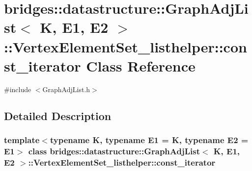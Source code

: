 \hypertarget{classbridges_1_1datastructure_1_1_graph_adj_list_1_1_vertex_element_set__listhelper_1_1const__iterator}{}\section{bridges\+:\+:datastructure\+:\+:Graph\+Adj\+List$<$ K, E1, E2 $>$\+:\+:Vertex\+Element\+Set\+\_\+listhelper\+:\+:const\+\_\+iterator Class Reference}
\label{classbridges_1_1datastructure_1_1_graph_adj_list_1_1_vertex_element_set__listhelper_1_1const__iterator}


{\ttfamily \#include $<$Graph\+Adj\+List.\+h$>$}



\subsection{Detailed Description}
\subsubsection*{template$<$typename K, typename E1 = K, typename E2 = E1$>$\newline
class bridges\+::datastructure\+::\+Graph\+Adj\+List$<$ K, E1, E2 $>$\+::\+Vertex\+Element\+Set\+\_\+listhelper\+::const\+\_\+iterator}

